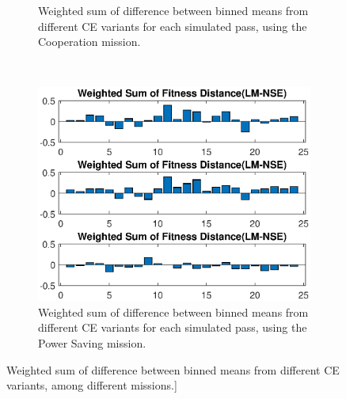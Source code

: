 \begin{figure}[ht!]
\begin{subfigure}{0.55\linewidth}
	\caption{Weighted sum of difference between binned means from different CE variants for each simulated pass, using the Cooperation mission.}
	\label{fig:cSimWeightCoop}
\end{subfigure}\\
\begin{center}
\begin{subfigure}{0.55\linewidth}
	\centering
	\includegraphics[scale=0.6]{figures/c_sim_results/power_weighted_sumFitness.eps}
	\caption{Weighted sum of difference between binned means from different CE variants for each simulated pass, using the Power Saving mission.}
	\label{fig:cSimWeightPower}
\end{subfigure}
\end{center}
\caption{Weighted sum of difference between binned means from different CE variants, among different missions.]}
\label{fig:weight_sumFit}
\end{figure}
\clearpage
